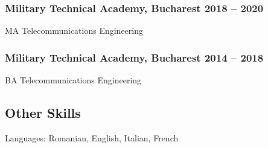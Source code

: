\documentclass[a4paper,12pt]{article}
\begin{document}
\subsubsection*{\textbf{Military Technical Academy}, Bucharest \hfill 2018 -- 2020}
\label{sec:org405366f}
MA Telecommunications Engineering
\subsubsection*{\textbf{Military Technical Academy}, Bucharest \hfill 2014 -- 2018}
\label{sec:org93c5c51}
BA Telecommunications Engineering
\subsection*{\textbf{Other Skills}}
\label{sec:orgc71638d}
Languages: Romanian, English, Italian, French
\end{document}

